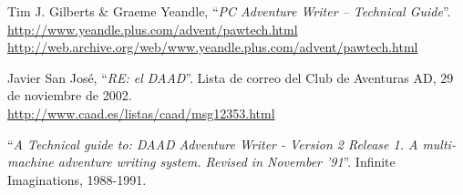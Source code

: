 \documentclass[11pt, a5paper]{article}
\begin{document}
\begin{thebibliography}{99}
  Tim J. Gilberts \& Graeme Yeandle,
  ``\emph{PC Adventure Writer -- Technical Guide}''.\\
  \url{http://www.yeandle.plus.com/advent/pawtech.html}\\
  \url{http://web.archive.org/web/www.yeandle.plus.com/advent/pawtech.html}

  Javier San José,
  ``\emph{RE: el DAAD}''.
  Lista de correo del Club de Aventuras AD,
  29 de noviembre de 2002.\\
  \url{http://www.caad.es/listas/caad/msg12353.html}

  ``\emph{A Technical guide to: DAAD Adventure Writer - Version 2 Release 1. A multi-machine adventure writing system. Revised in November '91}''.
  Infinite Imaginations,
  1988-1991.

\end{thebibliography}
\end{document}
